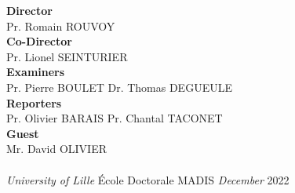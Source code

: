 \begin{center}
    \large
    \textbf{Director}\\
    \large
    \vspace{.5cm}
    Pr. Romain \textsc{ROUVOY}
    \endminipage
    \vspace{0.5cm}
    \large
    \\
    \textbf{Co-Director}\\
    \large
    \vspace{.5cm}
    Pr. Lionel \textsc{SEINTURIER}
    \endminipage
    \vspace{0.5cm}
    \\
    \large
    \textbf{Examiners}\\
    \large
    \vspace{.5cm}
    Pr. Pierre \textsc{BOULET} \newline
    Dr. Thomas \textsc{DEGUEULE}
    \endminipage
    \vspace{.5cm}
    \\
    \large
    \textbf{Reporters}\\
    \large
    \vspace{.5cm}
    Pr. Olivier \textsc{BARAIS} \newline
    Pr. Chantal \textsc{TACONET}
    \endminipage
    \vspace{0.5cm}
    \\
    \large
    \textbf{Guest}\\
    \large
    \vspace{.5cm}
    Mr. David \textsc{OLIVIER}\\
    \endminipage
    \vspace{0.5cm}
    \\
    \Large
    \emph{University of Lille}
    \'Ecole Doctorale MADIS
    \endminipage
    \emph{December} 2022
    \endminipage



\end{center}